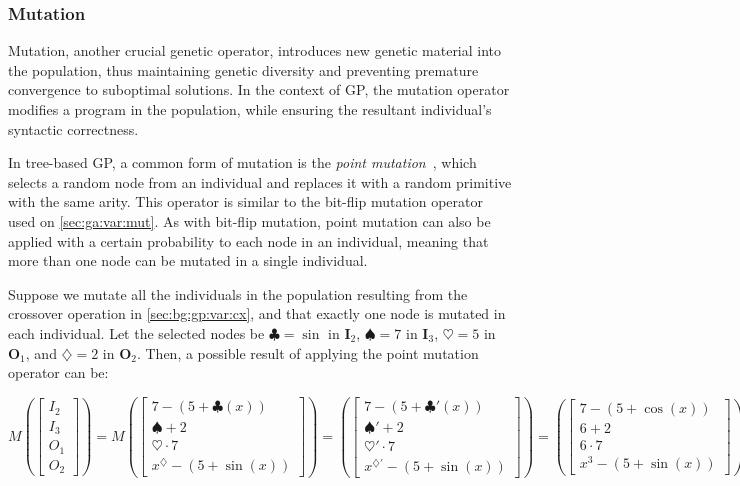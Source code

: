 \subsubsection{Mutation}
\label{sec:bg:gp:variation:mutation}
  Mutation, another crucial genetic operator, introduces new genetic material 
  into the population, thus maintaining genetic diversity and preventing 
  premature convergence to suboptimal solutions.
  In the context of GP, the mutation operator modifies a program in the
  population, while ensuring the resultant individual's syntactic correctness.

  In tree-based GP, a common form of mutation is the \emph{point 
  mutation}~\autocite{poliFieldGuideGenetic2008a,wilhelmstotterJeneticsJavaGenetica},
  which selects a random node from an individual and replaces it with a random
  primitive with the same arity.
  This operator is similar to the bit-flip mutation operator used on 
  \vref{sec:ga:var:mut}.
  As with bit-flip mutation, point mutation can also be applied with a certain
  probability to each node in an individual, meaning that more than one node
  can be mutated in a single individual.

  Suppose we mutate all the individuals in the population resulting from the
  crossover operation in \vref{sec:bg:gp:var:cx}, and that exactly
  one node is mutated in each individual.
  Let the selected nodes be \(\clubsuit = \sin\) in \(\mathbf{I}_2\),
  \(\spadesuit = 7\) in \(\mathbf{I}_3\), \(\heartsuit = 5\) in 
  \(\mathbf{O}_1\), and \(\diamondsuit = 2\) in \(\mathbf{O}_2\).
  Then, a possible result of applying the point mutation operator can be:

  \[
    M\!\left(
      \begin{bmatrix}
        I_2 \\ I_3 \\ O_1 \\ O_2
      \end{bmatrix}
    \right) = M\!\left(
      \begin{bmatrix}
        7 - (5 + \clubsuit(x)) \\
        \spadesuit + 2 \\
        \heartsuit \cdot 7 \\
        x^\diamondsuit - (5 + \sin(x))
      \end{bmatrix}
    \right) = \left(
      \begin{bmatrix}
        7 - (5 + \clubsuit'(x)) \\
        \spadesuit' + 2 \\
        \heartsuit' \cdot 7 \\
        x^{\diamondsuit'} - (5 + \sin(x))
      \end{bmatrix}
    \right) = \left(
      \begin{bmatrix}
        7 - (5 + \cos(x)) \\
        6 + 2 \\
        6 \cdot 7 \\
        x^3 - (5 + \sin(x))
      \end{bmatrix}
    \right)
  \]

